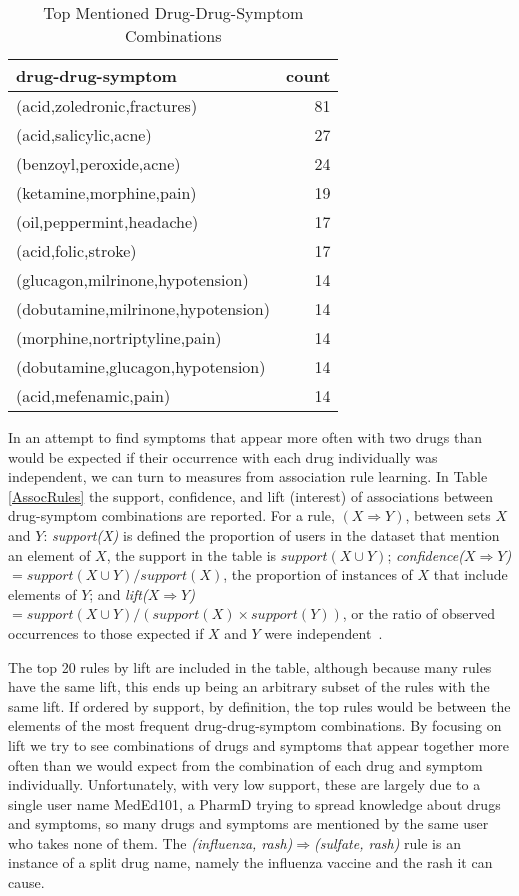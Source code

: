 \documentclass[letterpaper]{article}
\begin{document}
\begin{table}
\centering
\begin{tabular}{lr}
\hline
drug-drug-symptom & count \\
\hline
(acid,zoledronic,fractures) & 81\\
(acid,salicylic,acne) & 27\\
(benzoyl,peroxide,acne) & 24\\
(ketamine,morphine,pain) & 19\\
(oil,peppermint,headache) & 17\\
(acid,folic,stroke) & 17\\
(glucagon,milrinone,hypotension) & 14\\
(dobutamine,milrinone,hypotension) & 14\\
(morphine,nortriptyline,pain) & 14\\
(dobutamine,glucagon,hypotension) & 14\\
(acid,mefenamic,pain) & 14\\
\hline
\end{tabular}
\caption{\label{TabcoCoDrugSymptomCount} Top Mentioned Drug-Drug-Symptom Combinations}
\end{table}

In an attempt to find symptoms that appear more often with two drugs than would be expected if their occurrence with each drug individually was independent, we can turn to measures from association rule learning. In Table \ref{AssocRules} the support, confidence, and lift (interest) of associations between drug-symptom combinations are reported. For a rule, $(X \Rightarrow Y)$, between sets $X$ and $Y$: \textit{support(X)} is defined the proportion of users in the dataset that mention an element of $X$, the support in the table is $support(X \cup Y)$; \textit{confidence($X \Rightarrow Y$)} $=support(X \cup Y)/support(X)$, the proportion of instances of $X$ that include elements of $Y$; and \textit{lift($X \Rightarrow Y$)} $=support(X \cup Y)/(support(X) \times support(Y))$, or the ratio of observed occurrences to those expected if $X$ and $Y$ were independent~\citep{tan2004selecting}.

The top 20 rules by lift are included in the table, although because many rules have the same lift, this ends up being an arbitrary subset of the rules with the same lift. If ordered by support, by definition, the top rules would be between the elements of the most frequent drug-drug-symptom combinations. By focusing on lift we try to see combinations of drugs and symptoms that appear together more often than we would expect from the combination of each drug and symptom individually. Unfortunately, with very low support, these are largely due to a single user name MedEd101, a PharmD trying to spread knowledge about drugs and symptoms, so many drugs and symptoms are mentioned by the same user who takes none of them. The \textit{(influenza, rash)$\Rightarrow$(sulfate, rash)} rule is an instance of a split drug name, namely the influenza vaccine and the rash it can cause.
\end{document}
